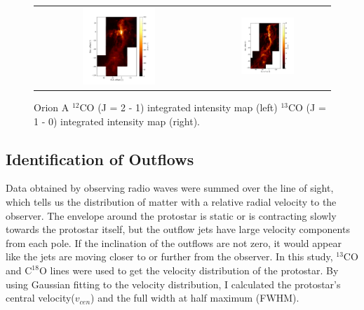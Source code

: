 \begin{figure}[t]
	\begin{center}
		\begin{tabular}{cc}
			\includegraphics[width=0.45\textwidth]{RNE_12CO_Orion} & \includegraphics[width=0.45\textwidth]{Orion_13CO_intmap}
		\end{tabular}
	\end{center}
	\caption{Orion A $^{12}$CO (J = 2 - 1) integrated intensity map (left) $^{13}$CO (J = 1 - 0) integrated intensity map (right).}
	\label{fig:map1}  %
\end{figure}

\subsection{Identification of Outflows}
Data obtained by observing radio waves were summed over the line of sight, which tells us the distribution of matter with a relative radial velocity to the observer. The envelope around the protostar is static or is contracting slowly towards the protostar itself, but the outflow jets have large velocity components from each pole. If the inclination of the outflows are not zero, it would appear like the jets are moving closer to or further from the observer. 
In this study, $^{13}$CO and $\textrm{C}^{18}\textrm{O}$ lines were used to get the velocity distribution of the protostar. By using Gaussian fitting to the velocity distribution, I calculated the protostar’s central velocity($v_{cen}$) and the full width at half maximum (FWHM). 

